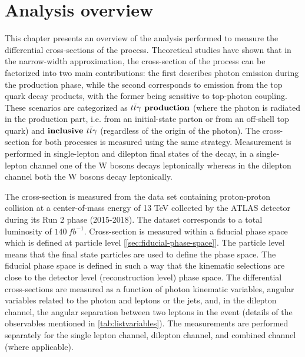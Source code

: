 \chapter{Analysis overview}
\label{analysis_overview}
This chapter presents an overview of the analysis performed to measure the differential cross-sections of the \tty process. Theoretical studies have shown that in the narrow-width approximation, the cross-section of the \tty process can be factorized into two main contributions: the first describes photon emission during the production phase, while the second corresponds to emission from the top quark decay products, with the former being sensitive to top-photon coupling. These scenarios are categorized as $\textbf{\tty production}$ (where the photon is radiated in the production part, i.e. from an initial-state parton or from an off-shell top quark) and $\textbf{inclusive $t\bar{t}\gamma$}$ (regardless of the origin of the photon). The cross-section for both processes is measured using the same strategy. Measurement is performed in single-lepton and dilepton final states of the \ttbar decay, in a single-lepton channel one of the W bosons decays leptonically whereas in the dilepton channel both the W bosons decay leptonically. 

The cross-section is measured from the data set containing proton-proton collision at a center-of-mass energy of 13 TeV collected by the ATLAS detector during its Run 2 phase (2015-2018). The dataset corresponds to a total luminosity of $140 \ fb^{-1}$. Cross-section is measured within a fiducial phase space which is defined at particle level [\cref{sec:fiducial-phase-space}]. The particle level means that the final state particles are used to define the phase space. The fiducial phase space is defined in such a way that the kinematic selections are close to the detector level (reconstruction level) phase space. The differential cross-sections are measured as a function of photon kinematic variables, angular variables related to the photon and leptons or the jets, and, in the dilepton channel, the angular separation between two leptons in the event (details of the observables mentioned in \cref{tab:listvariables}). The measurements are performed separately for the single lepton channel, dilepton channel, and combined channel (where applicable).


